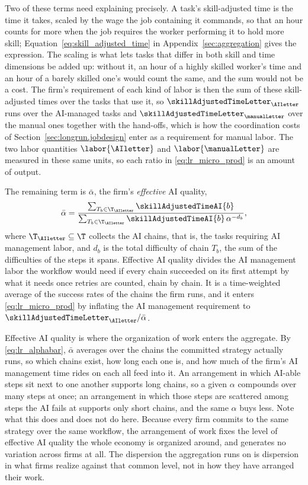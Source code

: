 Two of these terms need explaining precisely.
A task's skill-adjusted time is the time it takes, scaled by the wage the job containing it commands, so that an hour counts for more when the job requires the worker performing it to hold more skill; Equation~\eqref{eq:skill_adjusted_time} in Appendix~\ref{sec:aggregation} gives the expression.
The scaling is what lets tasks that differ in both skill and time dimensions be added up: without it, an hour of a highly skilled worker's time and an hour of a barely skilled one's would count the same, and the sum would not be a cost.
The firm's requirement of each kind of labor is then the sum of these skill-adjusted times over the tasks that use it, so $\skillAdjustedTimeLetter_{\AIletter}$ runs over the AI-managed tasks and $\skillAdjustedTimeLetter_{\manualLetter}$ over the manual ones together with the hand-offs, which is how the coordination costs of Section~\ref{sec:longrun.jobdesign} enter as a requirement for manual labor.
The two labor quantities $\labor{\AIletter}$ and $\labor{\manualLetter}$ are measured in these same units, so each ratio in \eqref{eq:lr_micro_prod} is an amount of output.

The remaining term is $\bar{\alpha}$, the firm's \emph{effective} AI quality,
\begin{align}
\label{eq:lr_alphabar}
\bar{\alpha} = \frac{\sum_{T_b \in \T_{\AIletter}}\skillAdjustedTimeAI{b}}{\sum_{T_b \in \T_{\AIletter}}\skillAdjustedTimeAI{b}\,\alpha^{-d_{b}}},
\end{align}
where $\T_{\AIletter} \subseteq \T$ collects the AI chains, that is, the tasks requiring AI management labor, and $d_b$ is the total difficulty of chain $T_b$, the sum of the difficulties of the steps it spans.
Effective AI quality divides the AI management labor the workflow would need if every chain succeeded on its first attempt by what it needs once retries are counted, chain by chain.
It is a time-weighted average of the success rates of the chains the firm runs, and it enters \eqref{eq:lr_micro_prod} by inflating the AI management requirement to $\skillAdjustedTimeLetter_{\AIletter}/\bar{\alpha}$.

Effective AI quality is where the organization of work enters the aggregate.
By \eqref{eq:lr_alphabar}, $\bar{\alpha}$ averages over the chains the committed strategy actually runs, so which chains exist, how long each one is, and how much of the firm's AI management time rides on each all feed into it.
An arrangement in which AI-able steps sit next to one another supports long chains, so a given $\alpha$ compounds over many steps at once; an arrangement in which those steps are scattered among steps the AI fails at supports only short chains, and the same $\alpha$ buys less.
Note what this does and does not do here.
Because every firm commits to the same strategy over the same workflow, the arrangement of work fixes the level of effective AI quality the whole economy is organized around, and generates no variation across firms at all.
The dispersion the aggregation runs on is dispersion in what firms realize against that common level, not in how they have arranged their work.


